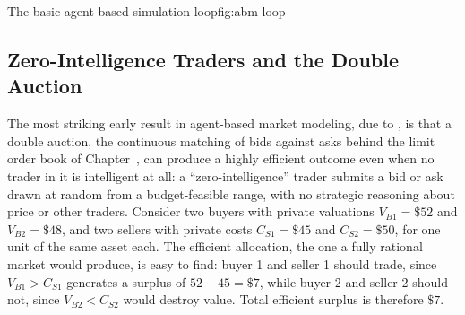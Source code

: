 \documentclass[../ai_in_finance]{subfiles}
\begin{document}
\begin{bookfigure}[htbp]{The basic agent-based simulation loop}{fig:abm-loop}
\end{bookfigure}

\subsection{Zero-Intelligence Traders and the Double Auction}
\label{sec:abm-zi}

The most striking early result in agent-based market modeling, due to \textcite{gode1993allocative}, is that a double auction, the continuous matching of bids against asks behind the limit order book of Chapter~, can produce a highly efficient outcome even when no trader in it is intelligent at all: a ``zero-intelligence'' trader submits a bid or ask drawn at random from a budget-feasible range, with no strategic reasoning about price or other traders. Consider two buyers with private valuations $V_{B1}=\$52$ and $V_{B2}=\$48$, and two sellers with private costs $C_{S1}=\$45$ and $C_{S2}=\$50$, for one unit of the same asset each. The efficient allocation, the one a fully rational market would produce, is easy to find: buyer 1 and seller 1 should trade, since $V_{B1} > C_{S1}$ generates a surplus of $52-45=\$7$, while buyer 2 and seller 2 should not, since $V_{B2} < C_{S2}$ would destroy value. Total efficient surplus is therefore $\$7$.
\end{document}
